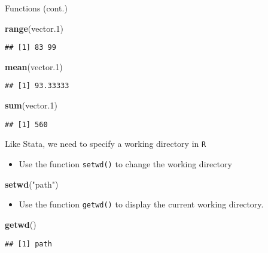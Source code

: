 \documentclass[ignorenonframetext,]{beamer}
\newenvironment{Shaded}{\begin{snugshade}}{\end{snugshade}}
\newcommand{\KeywordTok}[1]{\textcolor[rgb]{0.13,0.29,0.53}{\textbf{#1}}}
\newcommand{\DecValTok}[1]{\textcolor[rgb]{0.00,0.00,0.81}{#1}}
\newcommand{\StringTok}[1]{\textcolor[rgb]{0.31,0.60,0.02}{#1}}
\newcommand{\NormalTok}[1]{#1}
\providecommand{\tightlist}{%
	\setlength{\itemsep}{0pt}\setlength{\parskip}{0pt}}
\begin{document}
\begin{frame}[fragile]{Functions (cont.)}

\begin{Shaded}
\begin{Highlighting}[]
\KeywordTok{range}\NormalTok{(vector.}\DecValTok{1}\NormalTok{)}
\end{Highlighting}
\end{Shaded}

\begin{verbatim}
## [1] 83 99
\end{verbatim}

\begin{Shaded}
\begin{Highlighting}[]
\KeywordTok{mean}\NormalTok{(vector.}\DecValTok{1}\NormalTok{)}
\end{Highlighting}
\end{Shaded}

\begin{verbatim}
## [1] 93.33333
\end{verbatim}

\begin{Shaded}
\begin{Highlighting}[]
\KeywordTok{sum}\NormalTok{(vector.}\DecValTok{1}\NormalTok{)}
\end{Highlighting}
\end{Shaded}

\begin{verbatim}
## [1] 560
\end{verbatim}

\end{frame}

\begin{frame}[fragile]{Like Stata, we need to specify a working
directory in \texttt{R}}

\begin{itemize}
\tightlist
\item
  Use the function \texttt{setwd()} to change the working directory
\end{itemize}

\begin{Shaded}
\begin{Highlighting}[]
\KeywordTok{setwd}\NormalTok{(}\StringTok{"path"}\NormalTok{)}
\end{Highlighting}
\end{Shaded}

\begin{itemize}
\tightlist
\item
  Use the function \texttt{getwd()} to display the current working
  directory.
\end{itemize}

\begin{Shaded}
\begin{Highlighting}[]
\KeywordTok{getwd}\NormalTok{()}
\end{Highlighting}
\end{Shaded}

\texttt{\#\#\ {[}1{]}\ path}

\end{frame}
\end{document}

